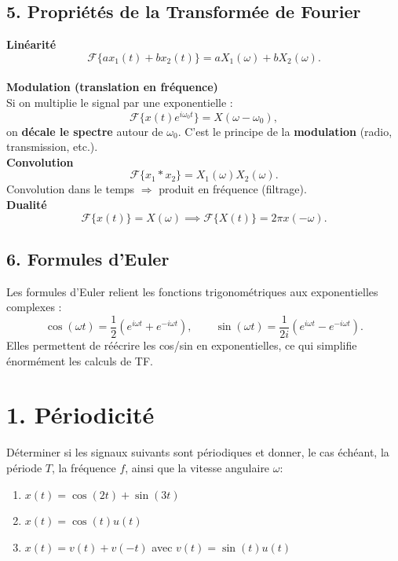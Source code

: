 \subsection*{5. Propriétés de la Transformée de Fourier}

\textbf{Linéarité}
\[
\mathcal{F}\{a x_1(t) + b x_2(t)\} = a X_1(\omega) + b X_2(\omega).
\]
 \\
\textbf{Modulation (translation en fréquence)}  \\
Si on multiplie le signal par une exponentielle :
\[
\mathcal{F}\{x(t) e^{i \omega_0 t}\} = X(\omega - \omega_0),
\]
on \textbf{décale le spectre} autour de $\omega_0$.  
C’est le principe de la \textbf{modulation} (radio, transmission, etc.). \\

\textbf{Convolution}  
\[
\mathcal{F}\{x_1 * x_2\} = X_1(\omega) X_2(\omega).
\]
Convolution dans le temps $\Rightarrow$ produit en fréquence (filtrage). \\

\textbf{Dualité}  
\[
\mathcal{F}\{x(t)\} = X(\omega) \implies \mathcal{F}\{X(t)\} = 2\pi x(-\omega).
\]

\subsection*{6. Formules d'Euler}

Les formules d’Euler relient les fonctions trigonométriques aux exponentielles complexes :
\[
\cos(\omega t) = \frac{1}{2}(e^{i\omega t}+e^{-i\omega t}), \qquad
\sin(\omega t) = \frac{1}{2i}(e^{i\omega t}-e^{-i\omega t}).
\]
Elles permettent de réécrire les cos/sin en exponentielles, ce qui simplifie énormément les calculs de TF.

\newpage

\section*{1. Périodicité}

\begin{exercise}
    Déterminer si les signaux suivants sont périodiques et donner, le cas échéant, la période $T$, la fréquence $f$, ainsi que la vitesse angulaire $\omega$: 
        \begin{enumerate}[label=(\alph*)]
            \item $x(t) = \cos(2t) + \sin(3t)$
            \item $x(t) = \cos(t)u(t)$
            \item $x(t) = v(t) + v(-t)$ avec $v(t) = \sin(t)u(t)$
        \end{enumerate}
\end{exercise}

